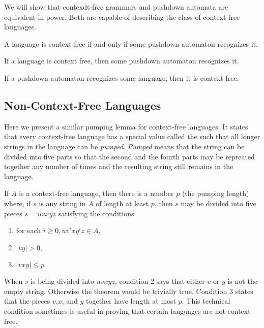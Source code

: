\documentclass{article}
\begin{document}
We will show that contexdt-free grammars and pushdown automata are equivalent in power. Both are capable of describing the class of context-free languages. 

\begin{theorem}
  A language is context free if and only if some pushdown automaton recognizes it. 
\end{theorem}

\begin{lemma}
  If a language is context free, then some pushdown automaton recognizes it.
\end{lemma}

\begin{lemma}
  If a pushdown automaton recognizes some language, then it is context free. 
\end{lemma}

\subsection{Non-Context-Free Languages}

Here we present a similar pumping lemma for context-free languages. It states that every context-free language has a special value called the  such that all longer strings in the language can be \emph{pumped}. \emph{Pumped} means that the string can be divided into five parts so that the second and the fourth parts may be repreated together any number of times and the resulting string still remains in the language. 

\begin{theorem}
  If $A$ is a context-free language, then there is a number $p$ (the pumping length) where, if $s$ is any string in $A$ of length at least $p$, then $s$ may be divided into five pieces $s=uvxyz$ satisfying the conditions
  \begin{enumerate}
    \item for each $i \geq 0, uv^i xy^i z \in A$, 
    \item $|vy| > 0$, 
    \item $|vxy| \leq p$
  \end{enumerate}
  When $s$ is being divided into $uvxyz$, condition 2 says that either $v$ or $y$ is not the empty string. Otherwise the theorem would be trivially true. Condition 3 states that the pieces $v$,$x$, and $y$ together have length at most $p$. This technical condition sometimes is useful in proving that certain languages are not context free. 
\end{theorem}
\end{document}
